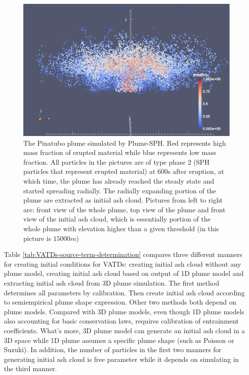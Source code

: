\begin{figure}[!htb]
\begin{minipage}{.325 \textwidth}
    \end{minipage}%
    \begin{minipage}{.325 \textwidth}
        \centering
        \includegraphics[width=0.99 \textwidth]{Chapter-7/Figures/mssfrc_front-z15000}
    \end{minipage}%
    \caption{The Pinatubo plume simulated by Plume-SPH. Red represents high mass fraction of erupted material while blue represents low mass fraction. All particles in the pictures are of type phase 2 (SPH particles that represent erupted material) at 600s after eruption, at which time, the plume has already reached the steady state and started spreading radially. The radially expanding portion of the plume are extracted as initial ash cloud. Pictures from left to right are: front view of the whole plume, top view of the plume and front view of the initial ash cloud, which is essentially portion of the whole plume with elevation higher than a given threshold (in this picture is $15000 m$)}
    \label{fig:Plume-SPH-Pinatubo-ash-cloud}
\end{figure}

Table \ref{tab:VATDs-source-term-determination} compares three different manners for creating initial conditions for VATDs: creating initial ash cloud without any plume model, creating initial ash cloud based on output of 1D plume model and extracting initial ash cloud from 3D plume simulation. The first method determines all parameters by calibration. Then create initial ash cloud according to semiempirical plume shape expression. Other two methods both depend on plume models. Compared with 3D plume models, even though 1D plume models also accounting for basic conservation laws, requires calibration of entrainment coefficients. What's more, 3D plume model can generate an initial ash cloud in a 3D space while 1D plume assumes a specific plume shape (such as Poisson or Suzuki). In addition, the number of particles in the first two manners for generating initial ash cloud is free parameter while it depends on simulating in the third manner. 
 

